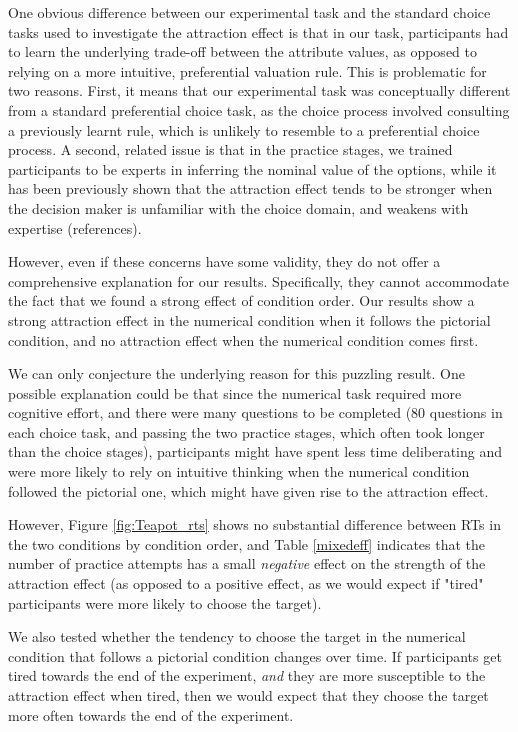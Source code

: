 \documentclass[11pt,a4paper]{article}
\begin{document}
One obvious difference between our experimental task and the standard choice tasks used to investigate the attraction effect is that in our task, participants had to learn the underlying trade-off between the attribute values, as opposed to relying on a more intuitive, preferential valuation rule. This is problematic for two reasons. First, it means that our experimental task was conceptually different from a standard preferential choice task, as the choice process involved consulting a previously learnt rule, which is unlikely to resemble to a preferential choice process. A second, related issue is that in the practice stages, we trained participants to be experts in inferring the nominal value of the options, while it has been previously shown that the attraction effect tends to be stronger when the decision maker is unfamiliar with the choice domain, and weakens with expertise (references). 

However, even if these concerns have some validity, they do not offer a comprehensive explanation for our results. Specifically, they cannot accommodate the fact that we found a strong effect of condition order. Our results show a strong attraction effect in the numerical condition when it follows the pictorial condition, and no attraction effect when the numerical condition comes first.

We can only conjecture the underlying reason for this puzzling result. One possible explanation could be that since the numerical task required more cognitive effort, and there were many questions to be completed (80 questions in each choice task, and passing the two practice stages, which often took longer than the choice stages), participants might have spent less time deliberating and were more likely to rely on intuitive thinking when the numerical condition followed the pictorial one, which might have given rise to the attraction effect. 

However, Figure \ref{fig:Teapot_rts} shows no substantial difference between RTs in the two conditions by condition order, and Table \ref{mixedeff} indicates that the number of practice attempts has a small \textit{negative} effect on the strength of the attraction effect (as opposed to a positive effect, as we would expect if "tired" participants were more likely to choose the target).

We also tested whether the tendency to choose the target in the numerical condition that follows a pictorial condition changes over time. If participants get tired towards the end of the experiment, \textit{and} they are more susceptible to the attraction effect when tired, then we would expect that they choose the target more often towards the end of the experiment. 
\end{document}
